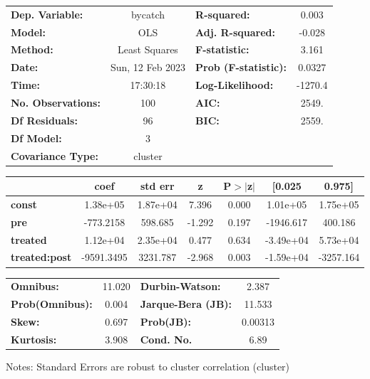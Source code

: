 \begin{center}
\begin{tabular}{lclc}
\toprule
\textbf{Dep. Variable:}    &     bycatch      & \textbf{  R-squared:         } &     0.003   \\
\textbf{Model:}            &       OLS        & \textbf{  Adj. R-squared:    } &    -0.028   \\
\textbf{Method:}           &  Least Squares   & \textbf{  F-statistic:       } &     3.161   \\
\textbf{Date:}             & Sun, 12 Feb 2023 & \textbf{  Prob (F-statistic):} &   0.0327    \\
\textbf{Time:}             &     17:30:18     & \textbf{  Log-Likelihood:    } &   -1270.4   \\
\textbf{No. Observations:} &         100      & \textbf{  AIC:               } &     2549.   \\
\textbf{Df Residuals:}     &          96      & \textbf{  BIC:               } &     2559.   \\
\textbf{Df Model:}         &           3      & \textbf{                     } &             \\
\textbf{Covariance Type:}  &     cluster      & \textbf{                     } &             \\
\bottomrule
\end{tabular}
\begin{tabular}{lcccccc}
                      & \textbf{coef} & \textbf{std err} & \textbf{z} & \textbf{P$> |$z$|$} & \textbf{[0.025} & \textbf{0.975]}  \\
\midrule
\textbf{const}        &     1.38e+05  &     1.87e+04     &     7.396  &         0.000        &     1.01e+05    &     1.75e+05     \\
\textbf{pre}          &    -773.2158  &      598.685     &    -1.292  &         0.197        &    -1946.617    &      400.186     \\
\textbf{treated}      &     1.12e+04  &     2.35e+04     &     0.477  &         0.634        &    -3.49e+04    &     5.73e+04     \\
\textbf{treated:post} &   -9591.3495  &     3231.787     &    -2.968  &         0.003        &    -1.59e+04    &    -3257.164     \\
\bottomrule
\end{tabular}
\begin{tabular}{lclc}
\textbf{Omnibus:}       & 11.020 & \textbf{  Durbin-Watson:     } &    2.387  \\
\textbf{Prob(Omnibus):} &  0.004 & \textbf{  Jarque-Bera (JB):  } &   11.533  \\
\textbf{Skew:}          &  0.697 & \textbf{  Prob(JB):          } &  0.00313  \\
\textbf{Kurtosis:}      &  3.908 & \textbf{  Cond. No.          } &     6.89  \\
\bottomrule
\end{tabular}
\end{center}

Notes: \newline
 [1] Standard Errors are robust to cluster correlation (cluster)